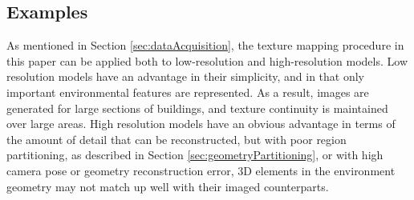 \documentclass[]{spie}  %
\begin{document}
\subsection{Examples}
\label{sec:examples}
As mentioned in Section \ref{sec:dataAcquisition}, the texture mapping
procedure in this paper can be applied both to low-resolution and
high-resolution models. Low resolution models have an advantage in
their simplicity, and in that only important environmental features
are represented. As a result, images are generated for large sections
of buildings, and texture continuity is maintained over large
areas. High resolution models have an obvious advantage in terms of
the amount of detail that can be reconstructed, but with poor region
partitioning, as described in Section \ref{sec:geometryPartitioning},
or with high camera pose or geometry reconstruction error, 3D elements
in the environment geometry may not match up well with their imaged
counterparts.
\end{document}
